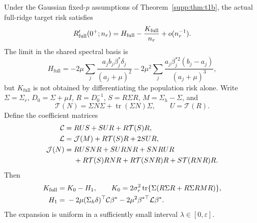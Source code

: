 \begin{theorem}\label{supp:thm:fullprime}
Under the Gaussian fixed-$p$ assumptions of Theorem~\ref{supp:thm:t1b}, the actual full-ridge target risk satisfies
\begin{equation}
  R_{\mathrm{full}}'(0^+;n_r)=H_{\mathrm{full}}-\frac{K_{\mathrm{full}}}{n_r}+o(n_r^{-1}).
  \label{supp:eq:fullprime}
\end{equation}
The limit in the shared spectral basis is
\begin{equation}
 H_{\mathrm{full}}=-2\mu\sum_j\frac{a_jb_j\beta_j^*\delta_j}{(a_j+\mu)^2}
 -2\mu^2\sum_j\frac{a_j\beta_j^{*2}(b_j-a_j)}{(a_j+\mu)^3},
\end{equation}
but $K_{\mathrm{full}}$ is not obtained by differentiating the population risk alone.
Write $\Sigma=\Sigma_r$, $D_0=\Sigma+\mu I$, $R=D_0^{-1}$, $S=R\Sigma R$, $M=\Sigma_h-\Sigma$, and
\begin{equation}
  \mathcal T(N)=\Sigma N\Sigma+\operatorname{tr}(\Sigma N)\Sigma,\qquad U=\mathcal T(R).
\end{equation}
Define the coefficient matrices
\begin{align}
  \mathcal C={}&RUS+SUR+R\mathcal T(S)R,\notag\\
  \mathcal L={}&\mathcal J(M)+R\mathcal T(S)R+2SUR,\notag\\
  \mathcal J(N)={}&RUSNR+SURNR+SNRUR\notag\\
  &+R\mathcal T(S)RNR+R\mathcal T(SNR)R+S\mathcal T(RNR)R.
  \label{supp:eq:fullgram}
\end{align}
Then
\begin{align}
  K_{\mathrm{full}}={}&K_0-H_1,\qquad
  K_0=2\sigma_r^2\operatorname{tr}\{\Sigma(R\Sigma R+R\Sigma RMR)\},\notag\\
  H_1={}&-2\mu(\Sigma_h\delta)^\top\mathcal C\beta^*
  -2\mu^2\beta^{*\top}\mathcal L\beta^*.
  \label{supp:eq:kfull}
\end{align}
The expansion is uniform in a sufficiently small interval $\lambda\in[0,\varepsilon]$.
\end{theorem}

